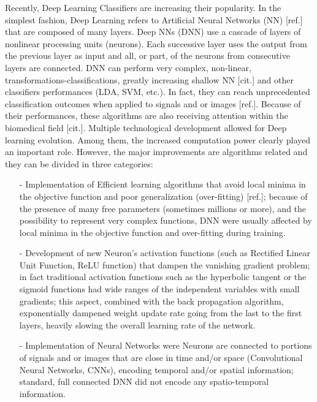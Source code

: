 \documentclass[12pt ]{iopart}
\begin{document}
Recently, Deep Learning Classifiers are increasing their popularity. In the simplest fashion, Deep Learning  refers to Artificial Neural Networks (NN) [ref.] that are composed of many layers. Deep NNs (DNN) use a cascade of  layers of nonlinear processing units (neurons). Each successive layer uses the output from the previous layer as input and all, or part, of the neurons from consecutive layers are connected. DNN can perform very complex, non-linear, transformations-classifications, greatly increasing shallow NN  [cit.]  and other classifiers performances (LDA, SVM, etc.). In fact, they can reach unprecedented classification outcomes when applied to signals and or images [ref.]. Because of their performances, these algorithms are also receiving  attention within the biomedical field [cit.]. 
Multiple technological development allowed for Deep learning evolution. 
Among them, the increased computation power clearly played an important role.
However, the major improvements are algorithms related and they can be divided in three  categories:

\begin{itemize}
	\item[-] Implementation of Efficient learning algorithms that avoid local minima in the objective function and poor generalization (over-fitting) [ref.]; because of the presence of many free parameters (sometimes millions or more), and the possibility to represent very complex functions, DNN were usually affected by local minima in the objective function and over-fitting  during training. 
	\item[-] Development of new Neuron's activation functions (such as Rectified Linear Unit Function, ReLU function) that dampen  the vanishing gradient problem; in fact traditional activation functions such as the hyperbolic tangent or the sigmoid functions had wide ranges of the independent variables with small gradients;  this aspect, combined with the back propagation algorithm, exponentially dampened weight update rate going from the last to the first layers, heavily slowing the overall learning rate of the network.
	\item[-] Implementation of  Neural Networks were Neurons are connected to portions of signals and or images that are close in time and/or space (Convolutional Neural Networks, CNNs), encoding temporal and/or spatial information; standard, full connected DNN  did not encode any spatio-temporal information.
\end{itemize}
\end{document}
